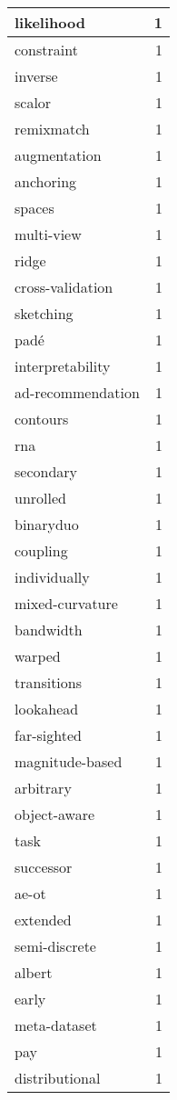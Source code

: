 \begin{table}[h]
\begin{tabular}{|l|r|}
\hline
likelihood & 1 \\
\hline
constraint & 1 \\
\hline
inverse & 1 \\
\hline
scalor & 1 \\
\hline
remixmatch & 1 \\
\hline
augmentation & 1 \\
\hline
anchoring & 1 \\
\hline
spaces & 1 \\
\hline
multi-view & 1 \\
\hline
ridge & 1 \\
\hline
cross-validation & 1 \\
\hline
sketching & 1 \\
\hline
padé & 1 \\
\hline
interpretability & 1 \\
\hline
ad-recommendation & 1 \\
\hline
contours & 1 \\
\hline
rna & 1 \\
\hline
secondary & 1 \\
\hline
unrolled & 1 \\
\hline
binaryduo & 1 \\
\hline
coupling & 1 \\
\hline
individually & 1 \\
\hline
mixed-curvature & 1 \\
\hline
bandwidth & 1 \\
\hline
warped & 1 \\
\hline
transitions & 1 \\
\hline
lookahead & 1 \\
\hline
far-sighted & 1 \\
\hline
magnitude-based & 1 \\
\hline
arbitrary & 1 \\
\hline
object-aware & 1 \\
\hline
task & 1 \\
\hline
successor & 1 \\
\hline
ae-ot & 1 \\
\hline
extended & 1 \\
\hline
semi-discrete & 1 \\
\hline
albert & 1 \\
\hline
early & 1 \\
\hline
meta-dataset & 1 \\
\hline
pay & 1 \\
\hline
distributional & 1 \\

\end{tabular}
\end{table}
